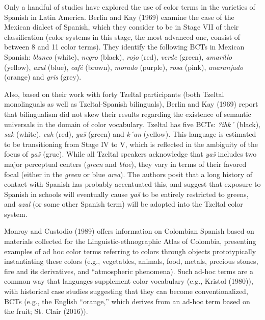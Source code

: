\documentclass[
  english,
  ,man,floatsintext]{apa6}
\begin{document}
Only a handful of studies have explored the use of color terms in the varieties of Spanish in Latin America. Berlin and Kay (1969) examine the case of the Mexican dialect of Spanish, which they consider to be in Stage VII of their classification (color systems in this stage, the most advanced one, consist of between 8 and 11 color terms). They identify the following BCTs in Mexican Spanish: \emph{blanco} (white), \emph{negro} (black), \emph{rojo} (red), \emph{verde} (green), \emph{amarillo} (yellow), \emph{azul} (blue), \emph{café} (brown), \emph{morado} (purple), \emph{rosa} (pink), \emph{anaranjado} (orange) and \emph{gris} (grey).

Also, based on their work with forty Tzeltal participants (both Tzeltal monolinguals as well as Tzeltal-Spanish bilinguals), Berlin and Kay (1969) report that bilingualism did not skew their results regarding the existence of semantic universals in the domain of color vocabulary. Tzeltal has five BCTs: \emph{?ihk´} (black), \emph{sak} (white), \emph{cah} (red), \emph{yaš} (green) and \emph{k´an} (yellow). This language is estimated to be transitioning from Stage IV to V, which is reflected in the ambiguity of the focus of \emph{yaš} (grue). While all Tzeltal speakers acknowledge that \emph{yaš} includes two major perceptual centers (\emph{green} and \emph{blue}), they vary in terms of their favored focal (either in the \emph{green} or blue \emph{area}). The authors posit that a long history of contact with Spanish has probably accentuated this, and suggest that exposure to Spanish in schools will eventually cause \emph{yaš} to be entirely restricted to greens, and \emph{azul} (or some other Spanish term) will be adopted into the Tzeltal color system.

Monroy and Custodio (1989) offers information on Colombian Spanish based on materials collected for the Linguistic-ethnographic Atlas of Colombia, presenting examples of ad hoc color terms referring to colors through objects prototypically instantiating these colors (e.g., vegetables, animals, food, metals, precious stones, fire and its derivatives, and \enquote{atmospheric phenomena). Such ad-hoc terms are a common way that languages supplement color vocabulary (e.g., Kristol (1980)), with historical case studies suggesting that they can become conventionalized, BCTs (e.g., the English ``orange,} which derives from an ad-hoc term based on the fruit; St. Clair (2016)).
\end{document}
